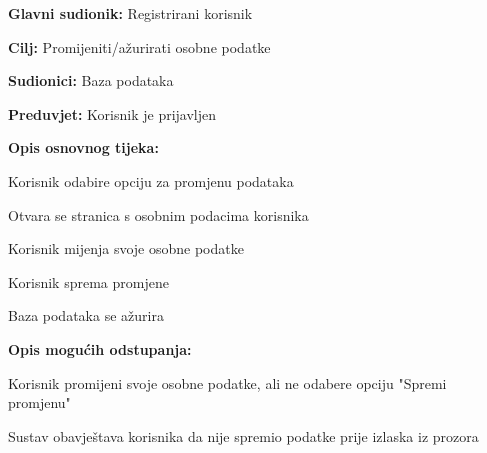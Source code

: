 				\noindent {}
					\begin{packed_item}
	
						\item \textbf{Glavni sudionik: }Registrirani korisnik
						\item  \textbf{Cilj:} Promijeniti/ažurirati osobne podatke
						\item  \textbf{Sudionici:} Baza podataka
						\item  \textbf{Preduvjet:} Korisnik je prijavljen
						\item  \textbf{Opis osnovnog tijeka:}
						
						\item[] \begin{packed_enum}
	
							\item Korisnik odabire opciju za promjenu podataka
							\item Otvara se stranica s osobnim podacima korisnika
							\item Korisnik mijenja svoje osobne podatke
							\item Korisnik sprema promjene
							\item Baza podataka se ažurira

						\end{packed_enum}
						
						\item  \textbf{Opis mogućih odstupanja:}
						
						\item[] \begin{packed_item}
	
							\item[2.a] Korisnik promijeni svoje osobne podatke, ali ne odabere opciju "Spremi promjenu"
							
								\begin{packed_item}
									\item Sustav obavještava korisnika da nije spremio podatke prije izlaska iz prozora
								\end{packed_item}
							
						\end{packed_item}						
					\end{packed_item}
					

